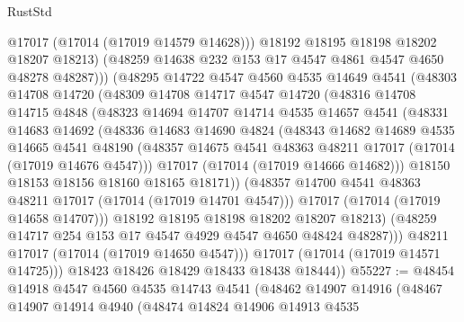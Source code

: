 \begin{lexlean}{RustStd}
\begin{coremodule}
{\begin{coremodule}
{{{{{{{{{{{{{{{{{{{{{{{{{{{{{{{{{{{{{{{{{{{{{{{{{{{{{{{                  @17017
                  (@17014 (@17019 @14579 @14628)))
                @18192
                @18195
                @18198
                @18202
                @18207
                @18213)
              (@48259 @14638 @232 @153 @17 @4547 @4861 @4547 @4650 @48278 @48287)))
          (@48295
            @14722
            @4547
            @4560
            @4535
            @14649
            @4541
            (@48303
              @14708
              @14720
              (@48309
                @14708
                @14717
                @4547
                @14720
                (@48316
                  @14708
                  @14715
                  @4848
                  (@48323
                    @14694
                    @14707
                    @14714
                    @4535
                    @14657
                    @4541
                    (@48331
                      @14683
                      @14692
                      (@48336
                        @14683
                        @14690
                        @4824
                        (@48343
                          @14682
                          @14689
                          @4535
                          @14665
                          @4541
                          @48190
                          (@48357 @14675 @4541 @48363 @48211 @17017 (@17014 (@17019 @14676 @4547)))
                          @17017
                          (@17014 (@17019 @14666 @14682)))
                        @18150
                        @18153
                        @18156
                        @18160
                        @18165
                        @18171))
                    (@48357 @14700 @4541 @48363 @48211 @17017 (@17014 (@17019 @14701 @4547)))
                    @17017
                    (@17014 (@17019 @14658 @14707)))
                  @18192
                  @18195
                  @18198
                  @18202
                  @18207
                  @18213)
                (@48259 @14717 @254 @153 @17 @4547 @4929 @4547 @4650 @48424 @48287)))
            @48211
            @17017
            (@17014 (@17019 @14650 @4547)))
          @17017
          (@17014 (@17019 @14571 @14725)))
        @18423
        @18426
        @18429
        @18433
        @18438
        @18444))
@55227 := @48454
    @14918
    @4547
    @4560
    @4535
    @14743
    @4541
    (@48462
      @14907
      @14916
      (@48467
        @14907
        @14914
        @4940
        (@48474
          @14824
          @14906
          @14913
          @4535
}}}}}}}}}}}}}}}}}}}}}}}}}}}}}}}}}}}}}}}}}}}}}}}}}}}}}}}
\end{coremodule}}
\end{coremodule}
\end{lexlean}
